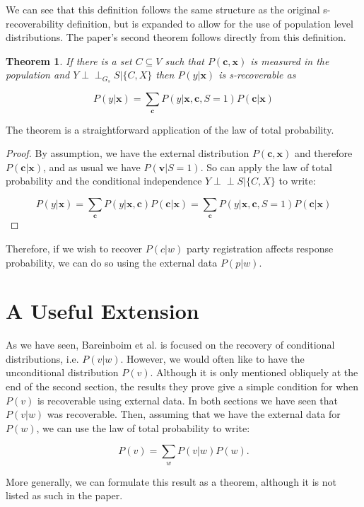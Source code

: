 \documentclass[12pt,twoside]{reedthesis}
\newtheorem{theorem}{Theorem}
\theoremstyle{definition}
\newcommand{\dsep}{\perp \!\!\!\perp}
\begin{document}
We can see that this definition follows the same structure as the original s-recoverability definition, but is expanded to allow for the use of population level distributions. The paper's second theorem follows directly from this definition.

\begin{theorem}
If there is a set $C \subseteq V$ such that $P(\mathbf{c}, \mathbf{x})$ is measured in the population and $Y \dsep_{G_s} S | \{C,X\}$ then $P(y | \mathbf{x})$ is s-recoverable as

$$P(y | \mathbf{x}) = \sum_{\mathbf{c}} P(y | \mathbf{x}, \mathbf{c}, S = 1)P(\mathbf{c} | \mathbf{x})$$
\end{theorem}

The theorem is a straightforward application of the law of total probability.
\begin{proof}
By assumption, we have the external distribution $P(\mathbf{c}, \mathbf{x})$ and therefore $P(\mathbf{c} | \mathbf{x})$, and as usual we have $P(\mathbf{v} | S =  1)$. So can apply the law of total probability and the conditional independence $Y \dsep S | \{C,X\}$ to write:

$$P(y | \mathbf{x}) = \sum_{\mathbf{c}} P(y | \mathbf{x}, \mathbf{c}) P(\mathbf{c} | \mathbf{x}) = \sum_{\mathbf{c}} P(y | \mathbf{x}, \mathbf{c}, S = 1) P(\mathbf{c} | \mathbf{x})$$

\end{proof}

Therefore, if we wish to recover $P(c | w)$ party registration affects response probability, we can do so using the external data $P(p | w)$.

\section{A Useful Extension}
As we have seen, Bareinboim et al. is focused on the recovery of conditional distributions, i.e. $P(v|w)$. However, we would often like to have the unconditional distribution $P(v)$. Although it is only mentioned obliquely at the end of the second section, the results they prove give a simple condition for when $P(v)$ is recoverable using external data. In both sections we have seen that $P(v|w)$ was recoverable. Then, assuming that we have the external data for $P(w)$, we can use the law of total probability to write:

$$P(v) = \sum_{w} P(v|w)P(w).$$

More generally, we can formulate this result as a theorem, although it is not listed as such in the paper.
\end{document}
